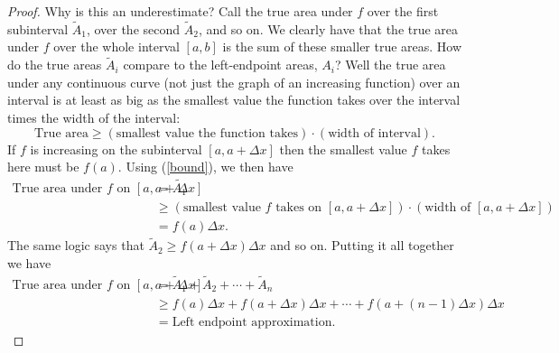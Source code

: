 \documentclass[11pt,letterpaper]{report}
\theoremstyle{remark}
\begin{document}
\begin{proof}
	\noindent Why is this an underestimate? Call the true area under $f$ over the first subinterval $\tilde{A}_1$, over the second $\tilde{A}_2$, and so on. We clearly have that the true area under $f$ over the whole interval $[a,b]$ is the sum of these smaller true areas. How do the true areas $\tilde{A}_i$ compare to the left-endpoint areas, $A_i$? Well the true area under any continuous curve (not just the graph of an increasing function) over an interval is at least as big as the smallest value the function takes over the interval times the width of the interval:
	\begin{equation}\label{bound}
	\text{True area} \geq (\text{smallest value the function takes}) \cdot (\text{width of interval}).
	\end{equation}
	If $f$ is increasing on the subinterval $[a, a+ \Delta x]$ then the smallest value $f$ takes here must be $f(a)$. Using (\ref{bound}), we then have
	\begin{align*}
		\text{True area under $f$ on $[a, a+\Delta x]$} &= \tilde{A_1}\\
		&\geq (\text{smallest value $f$ takes on $[a, a+\Delta x]$})\cdot (\text{width of }[a, a+\Delta x])\\
		&= f(a)\Delta x.
	\end{align*}
	The same logic says that $\tilde{A}_2 \geq f(a+\Delta x)\Delta x$ and so on. Putting it all together we have
	\begin{align*}
		\text{True area under $f$ on }[a, a+\Delta x] &= \tilde{A}_1 + \tilde{A}_2 + \cdots + \tilde{A}_n\\
		&\geq f(a)\Delta x + f(a+\Delta x)\Delta x + \cdots + f(a + (n-1)\Delta x)\Delta x\\
		&= \text{Left endpoint approximation}.
	\end{align*}
\end{proof}
\end{document}
